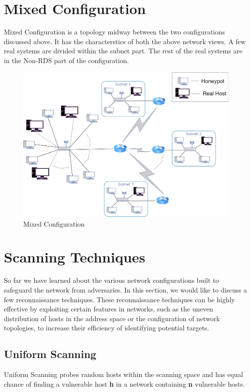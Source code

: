 \section{Mixed Configuration}
Mixed Configuration is a topology midway between the two configurations discussed above. It has the characterstics of both the above network views. A few real systems are divided within the subnet part. The rest of the real systems are in the Non-RDS part of the configuration.
    \FloatBarrier
    \begin{figure}[!htbp]
    \centering
      \includegraphics[scale=0.2]{Chap4/Mixed.png}
      \caption{Mixed Configuration}\label{fig:figure16}
    \end{figure} 
\section{Scanning Techniques}
So far we have learned about the various network configurations built to safeguard the network from adversaries. In this section, we would like to discuss a few reconnaissance techniques. These reconnaissance techniques can be highly effective by exploiting certain features in networks, such as the uneven distribution of hosts in the address space or the configuration of network topologies, to increase their efficiency of identifying potential targets. 
\subsection{Uniform Scanning}
Uniform Scanning probes random hosts within the scanning space and has equal chance of finding a vulnerable host \textbf{h} in a network containing \textbf{n} vulnerable hosts.
